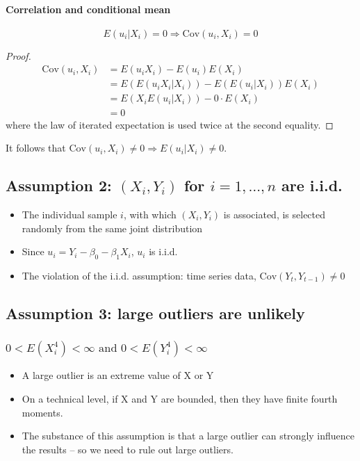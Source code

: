 \documentclass[a4paper,11pt]{article}
\newcommand{\cov}{\mathrm{Cov}}
\begin{document}
\paragraph*{Correlation and conditional mean}
\label{sec:orgd079d67}

\[ E(u_i | X_i) = 0 \Rightarrow \cov(u_i, X_i) = 0 \]

\begin{proof}
\begin{equation*}
\begin{split}
\cov(u_i, X_i) &= E(u_i X_i) - E(u_i) E(X_i) \\
&= E(E(u_i X_i|X_i)) - E(E(u_i|X_i)) E(X_i) \\
&= E(X_i E(u_i|X_i)) - 0 \cdot E(X_i) \\
&= 0
\end{split}
\end{equation*}
where the law of iterated expectation is used twice at the second equality.
\end{proof}

It follows that \(\cov(u_i, X_i) \neq 0 \Rightarrow E(u_i|X_i) \neq 0\).

\subsection{Assumption 2: \((X_i, Y_i)\) for \(i = 1, \ldots, n\) are i.i.d.}
\label{sec:org48d038e}
\begin{itemize}
\item The individual sample \(i\), with which \((X_i, Y_i)\) is associated, is
selected randomly from the same joint distribution
\item Since \(u_i = Y_i - \beta_0 - \beta_1 X_i\), \(u_{i}\) is i.i.d.
\item The violation of the i.i.d. assumption: time series data, \(\cov(Y_t,
  Y_{t-1}) \neq 0\)
\end{itemize}

\subsection{Assumption 3: large outliers are unlikely}
\label{sec:org8f0f255}
\subsubsection*{\(0 < E(X^4_i) < \infty \text{ and } 0 < E(Y_i^4) < \infty\)}
\label{sec:orge6eb983}

\begin{itemize}
\item A large outlier is an extreme value of X or Y
\item On a technical level, if X and Y are bounded, then they have finite
fourth moments.
\item The substance of this assumption is that a large outlier can
strongly influence the results – so we need to rule out large
outliers.
\end{itemize}
\end{document}
